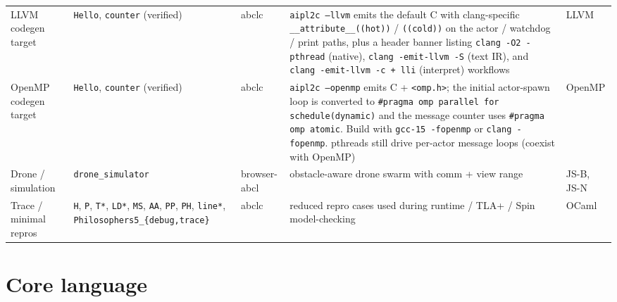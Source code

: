 \documentclass[10pt,a4paper,landscape]{article}
\begin{document}
\begin{longtable}{p{3.0cm} p{5.5cm} p{2.8cm} p{6.4cm} p{4.0cm}}
  LLVM codegen target & \texttt{Hello}, \texttt{counter} (verified) & abclc & \texttt{aipl2c --llvm} emits the default C with clang-specific \texttt{\_\_attribute\_\_((hot))} / \texttt{((cold))} on the actor / watchdog / print paths, plus a header banner listing \texttt{clang -O2 -pthread} (native), \texttt{clang -emit-llvm -S} (text IR), and \texttt{clang -emit-llvm -c + lli} (interpret) workflows & LLVM \\
  OpenMP codegen target & \texttt{Hello}, \texttt{counter} (verified) & abclc & \texttt{aipl2c --openmp} emits C + \texttt{<omp.h>}; the initial actor-spawn loop is converted to \texttt{\#pragma omp parallel for schedule(dynamic)} and the message counter uses \texttt{\#pragma omp atomic}. Build with \texttt{gcc-15 -fopenmp} or \texttt{clang -fopenmp}. pthreads still drive per-actor message loops (coexist with OpenMP) & OpenMP \\
  Drone / simulation & \texttt{drone\_simulator} & browser-abcl & obstacle-aware drone swarm with comm + view range & JS-B, JS-N \\
  Trace / minimal repros & \texttt{H}, \texttt{P}, \texttt{T*}, \texttt{LD*}, \texttt{MS}, \texttt{AA}, \texttt{PP}, \texttt{PH}, \texttt{line*}, \texttt{Philosophers5\_\{debug,trace\}} & abclc & reduced repro cases used during runtime / TLA+ / Spin model-checking & OCaml \\
  \bottomrule
\end{longtable}

\clearpage

\section*{Core language}
\end{document}
